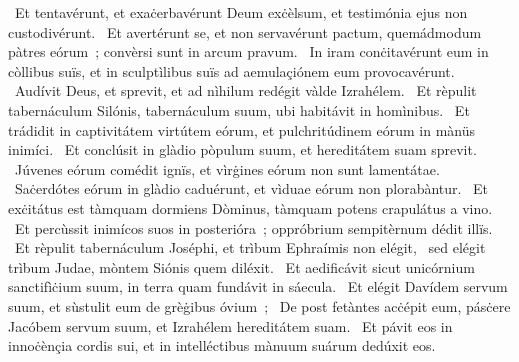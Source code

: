 ~Et tentavérunt, et exaċerbavérunt Deum exċèlsum, et testimónia ejus non custodivérunt. 
~Et avertérunt se, et non servavérunt pactum, quemádmodum pàtres eórum~; convèrsi sunt in arcum pravum. 
~In iram conċitavérunt eum in còllibus suïs, et in sculptìlibus suïs ad aemulaçiónem eum provocavérunt. 
~Audívit Deus, et sprevit, et ad nìhilum redégit vàlde Izrahélem. 
~Et rèpulit tabernáculum Silónis, tabernáculum suum, ubi habitávit in homìnibus. 
~Et trádidit in captivitátem virtútem eórum, et pulchritúdinem eórum in mànüs inimíci. 
~Et conclúsit in glàdio pòpulum suum, et hereditátem suam sprevit. 
~Júvenes eórum comédit ignïs, et vìrġines eórum non sunt lamentátae. 
~Saċerdótes eórum in glàdio caduérunt, et vìduae eórum non plorabàntur. 
~Et exċitátus est tàmquam dormiens Dòminus, tàmquam potens crapulátus a vino. 
~Et percùssit inimícos suos in posterióra~; oppróbrium sempitèrnum dédit illïs. 
~Et rèpulit tabernáculum Joséphi, et trìbum Ephraímis non elégit, 
~sed elégit trìbum Judae, mòntem Siónis quem diléxit. 
~Et aedificávit sicut unicórnium sanctifìċium suum, in terra quam fundávit in sáecula. 
~Et elégit Davídem servum suum, et sùstulit eum de grèġibus óvium~; 
~De post fetàntes acċépit eum, pásċere Jacóbem servum suum, et Izrahélem hereditátem suam. 
~Et pávit eos in innoċènçia cordis sui, et in intelléctibus mànuum suárum dedúxit eos. 
